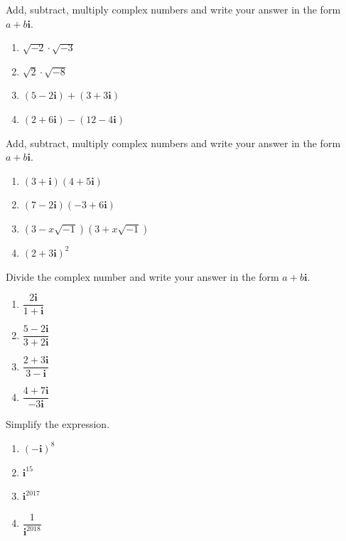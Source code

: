 \documentclass[
  en,11pt]{elegantbook}
\newcommand{\ii}{\mathbf{i}}
\let\BeginKnitrBlock\begin \let\EndKnitrBlock\end
\begin{document}
\BeginKnitrBlock{exercise}
\protect\hypertarget{exr:unnamed-chunk-106}{}{\label{exr:unnamed-chunk-106} }
Add, subtract, multiply complex numbers and write your answer in the form \(a+b\ii\).

\begin{enumerate}
\def\labelenumi{\arabic{enumi}.}

\item
  \(\sqrt{-2}\cdot\sqrt{-3}\)
\item
  \(\sqrt{2}\cdot\sqrt{-8}\)
\item
  \((5-2\ii)+(3+3\ii)\)
\item
  \((2+6\ii)-(12-4\ii)\)
\end{enumerate}
\EndKnitrBlock{exercise}

\BeginKnitrBlock{exercise}
\protect\hypertarget{exr:unnamed-chunk-107}{}{\label{exr:unnamed-chunk-107} }
Add, subtract, multiply complex numbers and write your answer in the form \(a+b\ii\).

\begin{enumerate}
\def\labelenumi{\arabic{enumi}.}

\item
  \((3+\ii)(4+5\ii)\)
\item
  \((7-2\ii)(-3+6\ii)\)
\item
  \((3-x\sqrt{-1})(3+x\sqrt{-1})\)
\item
  \((2+3\ii)^2\)
\end{enumerate}
\EndKnitrBlock{exercise}

\BeginKnitrBlock{exercise}
\protect\hypertarget{exr:unnamed-chunk-108}{}{\label{exr:unnamed-chunk-108} }
Divide the complex number and write your answer in the form \(a+b\ii\).

\begin{enumerate}
\def\labelenumi{\arabic{enumi}.}

\item
  \(\dfrac{2\ii}{1+\ii}\)
\item
  \(\dfrac{5-2\ii}{3+2\ii}\)
\item
  \(\dfrac{2+3\ii}{3-\ii}\)
\item
  \(\dfrac{4+7\ii}{-3\ii}\)
\end{enumerate}
\EndKnitrBlock{exercise}

\BeginKnitrBlock{exercise}
\protect\hypertarget{exr:unnamed-chunk-109}{}{\label{exr:unnamed-chunk-109} }
Simplify the expression.

\begin{enumerate}
\def\labelenumi{\arabic{enumi}.}

\item
  \((-\ii)^{8}\)
\item
  \(\ii^{15}\)
\item
  \(\ii^{2017}\)
\item
  \(\dfrac1{\ii^{2018}}\)
\end{enumerate}
\EndKnitrBlock{exercise}
\end{document}
